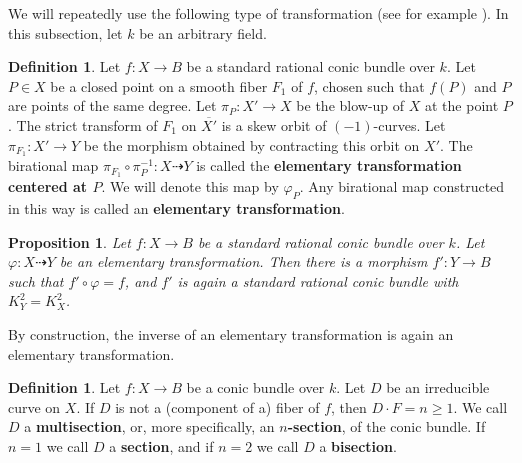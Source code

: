 \documentclass[a4paper, 11pt, reqno]{amsart}
\numberwithin{equation}{section} \numberwithin{figure}{section}
\newcommand{\term}[1]{\textbf{#1}}          %
\newcommand{\ra}{\rightarrow}
\newtheorem{proposition}[lemma]{Proposition}
\theoremstyle{definition}
\newtheorem{definition}[lemma]{Definition}
\numberwithin{lemma}{section}
\begin{document}
We will repeatedly use the following type of transformation (see for example \cite[\S2.3]{sarkisov}). In this subsection, let $k$ be an arbitrary field.
\begin{definition}
    Let $f \colon X \ra B$ be a standard rational conic bundle over $k$. Let $P \in X$ be a closed point on a smooth fiber $F_1$ of $f$, chosen such that $f(P)$ and $P$ are points of the same degree. Let $\pi_P \colon X'\ra X$ be the blow-up of $X$ at the point $P$. The strict transform of $F_1$ on $\overline{X'}$ is a skew orbit of $(-1)$-curves. Let $\pi_{F_1} \colon X' \ra Y$ be the morphism obtained by contracting this orbit on $X'$. The birational map $\pi_{F_1} \circ \pi_P^{-1} \colon X \dashrightarrow Y$ is called the \term{elementary transformation centered at $P$}. We will denote this map by $\varphi_{\scriptscriptstyle P}$. Any birational map constructed in this way is called an \term{elementary transformation}.
\end{definition}
 
\begin{proposition}\label{prop:elementarytransformations}
    Let $f \colon X \ra B$ be a standard rational conic bundle over $k$. Let $\varphi \colon X \dashrightarrow Y$ be an elementary transformation. Then there is a morphism $f' \colon Y \ra B$ such that $f' \circ \varphi = f$, and $f'$ is again a standard rational conic bundle with $K_{Y}^2 = K_X^2$.
\end{proposition}

By construction, the inverse of an elementary transformation is again an elementary transformation.

\begin{definition}
    Let $f \colon X \ra B$ be a conic bundle over $k$. Let $D$ be an irreducible curve on $X$. If $D$ is not a (component of a) fiber of $f$, then $D \cdot F = n \geq 1$. We call $D$ a \term{multisection}, or, more specifically, an \term{$n$-section}, of the conic bundle. If $n = 1$ we call $D$ a \term{section}, and if $n = 2$ we call $D$ a \term{bisection}. 
\end{definition}
\end{document}
